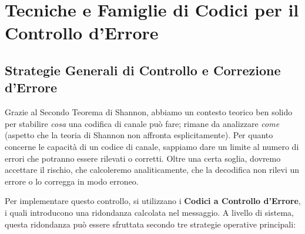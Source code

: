 \part{Tecniche e Famiglie di Codici per il Controllo d'Errore}

\chapter{Strategie Generali di Controllo e Correzione d'Errore}
Grazie al Secondo Teorema di Shannon, abbiamo un contesto teorico ben solido per stabilire \textit{cosa} una codifica di canale può fare; rimane da analizzare \textit{come} (aspetto che la teoria di Shannon non affronta esplicitamente).
Per quanto concerne le capacità di un codice di canale, sappiamo dare un limite al numero di errori che potranno essere rilevati o corretti. Oltre una certa soglia, dovremo accettare il rischio, che calcoleremo analiticamente, che la decodifica non rilevi un errore o lo corregga in modo erroneo.

Per implementare questo controllo, si utilizzano i \textbf{Codici a Controllo d'Errore}, i quali introducono una ridondanza calcolata nel messaggio. A livello di sistema, questa ridondanza può essere sfruttata secondo tre strategie operative principali:


